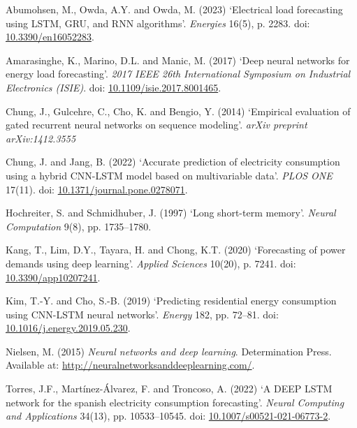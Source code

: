 \documentclass[mstat,12pt]{unswthesis}
\begin{document}
\label{refs}
\begin{CSLReferences}{0}{1}
Abumohsen, M., Owda, A.Y. and Owda, M. (2023) {`Electrical load
forecasting using LSTM, GRU, and RNN algorithms'}. \emph{Energies}
16(5), p. 2283. doi:
\href{https://doi.org/10.3390/en16052283}{10.3390/en16052283}.

Amarasinghe, K., Marino, D.L. and Manic, M. (2017) {`Deep neural
networks for energy load forecasting'}. \emph{2017 IEEE 26th
International Symposium on Industrial Electronics (ISIE)}. doi:
\href{https://doi.org/10.1109/isie.2017.8001465}{10.1109/isie.2017.8001465}.

Chung, J., Gulcehre, C., Cho, K. and Bengio, Y. (2014) {`Empirical
evaluation of gated recurrent neural networks on sequence modeling'}.
\emph{arXiv preprint arXiv:1412.3555}

Chung, J. and Jang, B. (2022) {`Accurate prediction of electricity
consumption using a hybrid CNN-LSTM model based on multivariable data'}.
\emph{PLOS ONE} 17(11). doi:
\href{https://doi.org/10.1371/journal.pone.0278071}{10.1371/journal.pone.0278071}.

Hochreiter, S. and Schmidhuber, J. (1997) {`Long short-term memory'}.
\emph{Neural Computation} 9(8), pp. 1735--1780.

Kang, T., Lim, D.Y., Tayara, H. and Chong, K.T. (2020) {`Forecasting of
power demands using deep learning'}. \emph{Applied Sciences} 10(20), p.
7241. doi:
\href{https://doi.org/10.3390/app10207241}{10.3390/app10207241}.

Kim, T.-Y. and Cho, S.-B. (2019) {`Predicting residential energy
consumption using CNN-LSTM neural networks'}. \emph{Energy} 182, pp.
72--81. doi:
\href{https://doi.org/10.1016/j.energy.2019.05.230}{10.1016/j.energy.2019.05.230}.

Nielsen, M. (2015) \emph{Neural networks and deep learning}.
Determination Press. Available at:
\url{http://neuralnetworksanddeeplearning.com/}.

Torres, J.F., Martínez-Álvarez, F. and Troncoso, A. (2022) {`A DEEP LSTM
network for the spanish electricity consumption forecasting'}.
\emph{Neural Computing and Applications} 34(13), pp. 10533--10545. doi:
\href{https://doi.org/10.1007/s00521-021-06773-2}{10.1007/s00521-021-06773-2}.


\end{CSLReferences}
\end{document}
